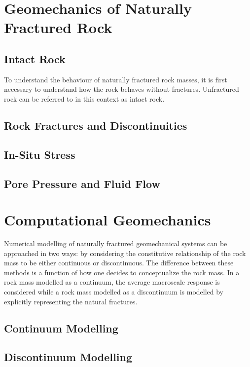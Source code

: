 \section{Geomechanics of Naturally Fractured Rock}


\subsection{Intact Rock}
To understand the behaviour of naturally fractured rock masses, it is first necessary to understand how the rock behaves without fractures. Unfractured rock can be referred to in this context as intact rock. 

\subsection{Rock Fractures and Discontinuities}


\subsection{In-Situ Stress}



\subsection{Pore Pressure and Fluid Flow}

\section{Computational Geomechanics}

Numerical modelling of naturally fractured geomechanical systems can be approached in two ways: by considering the constitutive relationship of the rock mass to be either continuous or discontinuous. The difference between these methods is a function of how one decides to conceptualize the rock mass. In a rock mass modelled as a continuum, the average macroscale response is considered while a rock mass modelled as a discontinuum is modelled by explicitly representing the natural fractures. 

\subsection{Continuum Modelling}

\subsection{Discontinuum Modelling}


